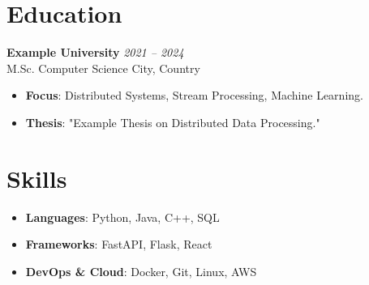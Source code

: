 \documentclass[10pt,a4paper]{article}
\begin{document}
\vspace{4pt}

\section{Education}

\textbf{Example University} \hfill \textit{2021 -- 2024}\\
M.Sc. Computer Science \hfill City, Country\\[2pt]
\begin{itemize}
  \item \textbf{Focus}: Distributed Systems, Stream Processing, Machine Learning.
  \item \textbf{Thesis}: "Example Thesis on Distributed Data Processing."
\end{itemize}

\vspace{4pt}

\section{Skills}

\begin{itemize}
  \item \textbf{Languages}: Python, Java, C++, SQL
  \item \textbf{Frameworks}: FastAPI, Flask, React
  \item \textbf{DevOps \& Cloud}: Docker, Git, Linux, AWS
\end{itemize}
\end{document}
